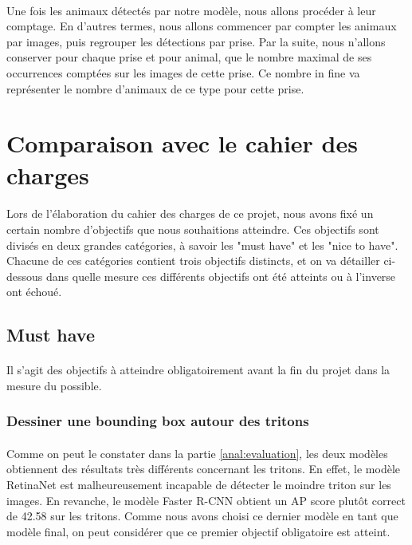 \paragraph{} Une fois les animaux détectés par notre modèle, nous allons procéder à leur comptage. En d'autres termes, nous allons commencer par compter les animaux par images, puis regrouper les détections par prise. Par la suite, nous n'allons conserver pour chaque prise et pour animal, que le nombre maximal de ses occurrences comptées sur les images de cette prise. Ce nombre in fine va représenter le nombre d'animaux de ce type pour cette prise. 

\section{Comparaison avec le cahier des charges}

\paragraph{} Lors de l'élaboration du cahier des charges de ce projet, nous avons fixé un certain nombre d'objectifs que nous souhaitions atteindre. Ces objectifs sont divisés en deux grandes catégories, à savoir les "must have" et les "nice to have". Chacune de ces catégories contient trois objectifs distincts, et on va détailler ci-dessous dans quelle mesure ces différents objectifs ont été atteints ou à l'inverse ont échoué.

\subsection{Must have}
\paragraph{} Il s'agit des objectifs à atteindre obligatoirement avant la fin du projet dans la mesure du possible.

\subsubsection{Dessiner une bounding box autour des tritons}\label{subsubsec:Retinanet_tritons}
\paragraph{} Comme on peut le constater dans la partie \ref{anal:evaluation}, les deux modèles obtiennent des résultats très différents concernant les tritons. En effet, le modèle RetinaNet est malheureusement incapable de détecter le moindre triton sur les images. En revanche, le modèle Faster R-CNN obtient un AP score plutôt correct de 42.58 sur les tritons. Comme nous avons choisi ce dernier modèle en tant que modèle final, on peut considérer que ce premier objectif obligatoire est atteint.

